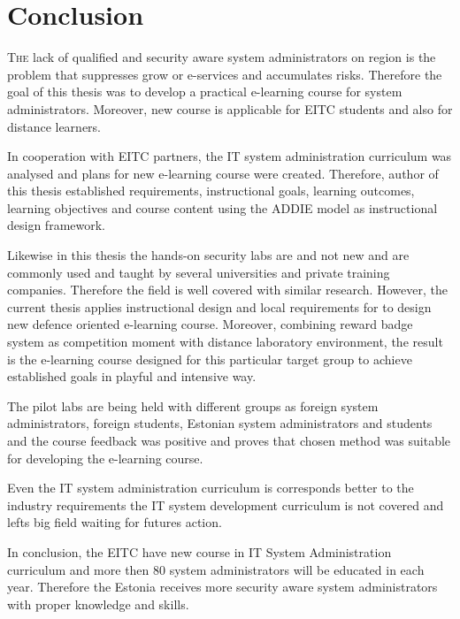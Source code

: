 \chapter{Conclusion}
\label{conclusion}
\lettrine[lraise=0.1, nindent=0em, slope=-.5em]{\color{Violet}T}{he} lack of qualified and security aware system administrators on region is the problem that suppresses grow or e-services and accumulates risks. Therefore the goal of this thesis was to develop a practical e-learning course for system administrators. Moreover, new course is applicable for \gls{EITC} students and also for distance learners. 

In cooperation with \gls{EITC} partners, the IT system administration curriculum was analysed and plans for new e-learning course were created. Therefore, author of this thesis established requirements, instructional goals, learning outcomes, learning objectives and course content using the \gls{ADDIE} model as instructional design framework. 

Likewise in this thesis the hands-on security labs are and not new and are commonly used and taught by several universities and private training companies. Therefore the field is well covered with similar research. However, the current thesis applies instructional design and local requirements for to design new defence oriented e-learning course. Moreover, combining reward badge system as competition moment with distance laboratory environment, the result is the e-learning course designed for this particular target group to achieve established goals in playful and intensive way.

The pilot labs are being held with different groups as foreign system administrators, foreign students, Estonian system administrators and students and the course feedback was positive and proves that chosen method was suitable for developing the e-learning course.

Even the IT system administration curriculum is corresponds better to the industry requirements the IT system development curriculum is not covered and lefts big field waiting for futures action.

In conclusion, the \gls{EITC} have new course in IT System Administration curriculum and more then 80 system administrators will be educated in each year. Therefore the Estonia receives more security aware system administrators with proper knowledge and skills.
